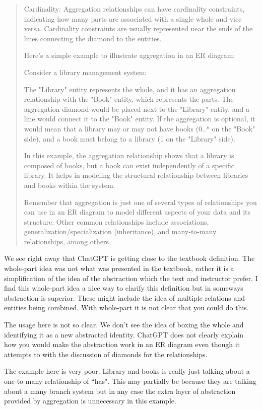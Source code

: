 \documentclass[11pt]{article}
\begin{document}
\begin{enumerate}
\begin{quotation}
    Cardinality: Aggregation relationships can have cardinality constraints, indicating how many parts are associated with a single whole and vice versa. Cardinality constraints are usually represented near the ends of the lines connecting the diamond to the entities.

Here's a simple example to illustrate aggregation in an ER diagram:

Consider a library management system:

    The "Library" entity represents the whole, and it has an aggregation relationship with the "Book" entity, which represents the parts.
    The aggregation diamond would be placed next to the "Library" entity, and a line would connect it to the "Book" entity.
    If the aggregation is optional, it would mean that a library may or may not have books (0..* on the "Book" side), and a book must belong to a library (1 on the "Library" side).

In this example, the aggregation relationship shows that a library is composed of books, but a book can exist independently of a specific library. It helps in modeling the structural relationship between libraries and books within the system.

Remember that aggregation is just one of several types of relationships you can use in an ER diagram to model different aspects of your data and its structure. Other common relationships include associations, generalization/specialization (inheritance), and many-to-many relationships, among others.
    
\end{quotation}

We see right away that ChatGPT is getting close to the textbook definition.  The whole-part idea was not what was presented in the textbook, rather it is a simplification of the idea of the abstraction which the text and instructor prefer.  I find this whole-part idea a nice way to clarify this definition but in someways abstraction is superior.  These might include the idea of multiple relations and entities being combined.  With whole-part it is not clear that you could do this.

The usage here is not so clear.  We don't see the idea of boxing the whole and identifying it as a new abstracted identity.  ChatGPT does not clearly explain how you would make the abstraction work in an ER diagram even though it attempts to with the discussion of diamonds for the relationships.

The example here is very poor.  Library and books is really just talking about a one-to-many relationship of ``has".  This may partially be because they are talking about a many branch system but in any case the extra layer of abstraction provided by aggregation is unnecessary in this example.  


\end{enumerate}
\end{document}
